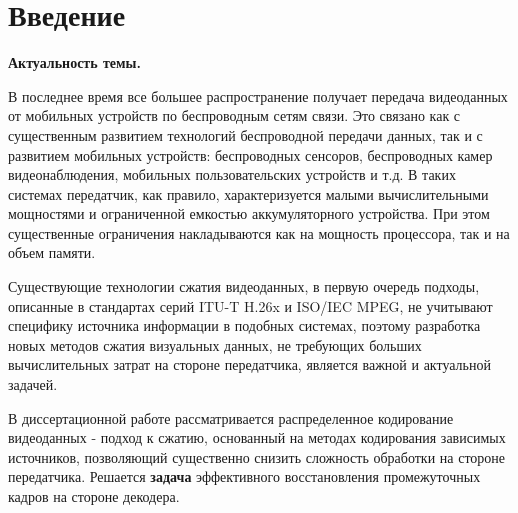 \chapter*{Введение}
\markboth{}{}

\textbf{Актуальность темы.} 

В последнее время все большее распространение получает передача видеоданных от мобильных устройств по беспроводным сетям связи. Это связано как с существенным развитием технологий беспроводной передачи данных, так и с развитием мобильных устройств: беспроводных сенсоров, беспроводных камер видеонаблюдения, мобильных пользовательских устройств и т.д. В таких системах передатчик, как правило, характеризуется малыми вычислительными мощностями и ограниченной емкостью аккумуляторного устройства. При этом существенные ограничения накладываются как на мощность процессора, так и на объем памяти.

Существующие технологии сжатия видеоданных, в первую очередь подходы, описанные в стандартах серий ITU-T H.26x и ISO/IEC MPEG, не учитывают специфику источника информации в подобных системах, поэтому разработка новых методов сжатия визуальных данных, не требующих больших вычислительных затрат на стороне передатчика, является важной и актуальной задачей.

В диссертационной работе рассматривается распределенное кодирование видеоданных - подход к сжатию, основанный на методах кодирования зависимых источников, позволяющий существенно снизить сложность обработки на стороне передатчика. Решается \textbf{задача} эффективного восстановления промежуточных кадров на стороне декодера.

